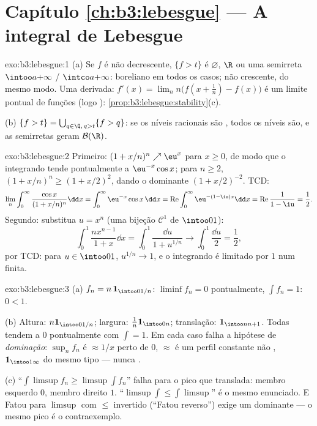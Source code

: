 \section*{Capítulo \ref{ch:b3:lebesgue} --- A integral de
Lebesgue}

\begin{solution}{exo:b3:lebesgue:1}
(a) Se $f$ é não decrescente, $\{f > t\}$ é $\varnothing$, $\R$
ou uma semirreta $\intoo a{+\infty}$ / $\intco a{+\infty}$: boreliano em
todos os casos; não crescente, do mesmo modo. Uma derivada: $f'(x) =
\lim_n n\bigl(f(x + \frac1n) - f(x)\bigr)$ é um limite pontual
de funções  (logo ):
\cref{prop:b3:lebesgue:stability}(c).

(b) $\{f > t\} = \bigcup_{q \in \Q,\, q > t}\{f > q\}$: se os
níveis racionais são , todos os níveis são, e as semirretas
geram $\mathcal B(\R)$.
\end{solution}

\begin{solution}{exo:b3:lebesgue:2}
Primeiro: $(1 + x/n)^n \nearrow \eu^x$ para $x \geq 0$, de modo que o
integrando tende pontualmente a $\eu^{-x}\cos x$; para $n \geq 2$,
$(1 + x/n)^n \geq (1 + x/2)^2$, dando o dominante 
$(1 + x/2)^{-2}$. TCD:
\[
\lim_n\int_0^\infty\frac{\cos x}{(1 + x/n)^n}\dd x
= \int_0^\infty \eu^{-x}\cos x\,\dd x
= \operatorname{Re}\int_0^\infty\eu^{-(1 - \iu)x}\dd x
= \operatorname{Re}\frac{1}{1 - \iu} = \frac12 .
\]
Segundo: substitua $u = x^n$ (uma bijeção $\mathcal C^1$ de
$\intoo01$):
\[
\int_0^1\frac{nx^{n-1}}{1 + x}\dd x = \int_0^1\frac{\dd u}{1 +
u^{1/n}} \longrightarrow \int_0^1\frac{\dd u}{2} = \frac12,
\]
por TCD: para $u \in \intoo01$, $u^{1/n} \to 1$, e o
integrando é limitado por $1$ num  finita.
\end{solution}

\begin{solution}{exo:b3:lebesgue:3}
(a) $f_n = n\,\mathbf 1_{\intoo0{1/n}}$: $\liminf f_n = 0$
pontualmente, $\int f_n = 1$: $0 < 1$.

(b) Altura: $n\mathbf 1_{\intoo0{1/n}}$; largura: $\frac1n\mathbf
1_{\intoo0n}$; translação: $\mathbf 1_{\intoo n{n+1}}$. Todas
tendem a $0$ pontualmente com $\int = 1$. Em cada caso falha a
hipótese de \emph{dominação}: $\sup_nf_n$ é
$\approx 1/x$ perto de $0$, $\approx$ é um perfil constante
não , $\mathbf 1_{\intoo1\infty}$ do mesmo tipo --- nunca .

(c) ``$\int\limsup f_n \geq \limsup\int f_n$'' falha para o
pico que translada: membro esquerdo $0$, membro direito $1$.
``$\limsup\int \leq \int\limsup$'' é o mesmo enunciado. E
Fatou para $\limsup$ com $\leq$ invertido
(``Fatou reverso'') exige um dominante --- o mesmo pico é
o contraexemplo.
\end{solution}

